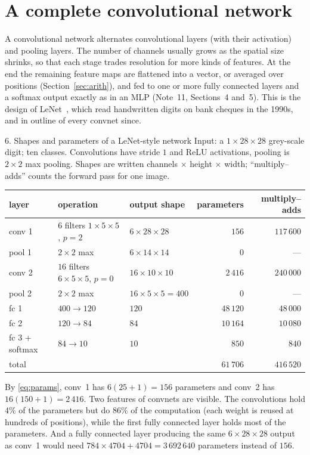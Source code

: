 \documentclass[11pt]{article}
\begin{document}
\section{A complete convolutional network}\label{sec:convnet}

A convolutional network alternates convolutional layers (with their activation) and pooling layers. The number of
channels usually grows as the spatial size shrinks, so that each stage trades resolution for more kinds of features. At
the end the remaining feature maps are flattened into a vector, or averaged over positions (Section~\ref{sec:arith}),
and fed to one or more fully connected layers and a softmax output exactly as in an MLP (Note~11, Sections~4 and~5). This is the design of
LeNet~\cite{lecun1998}, which read handwritten digits on bank cheques in the 1990s, and in outline of every convnet since.

\begin{worked}{6. Shapes and parameters of a LeNet-style network}
Input: a $1 \times 28 \times 28$ grey-scale digit; ten classes. Convolutions have stride $1$ and ReLU activations,
pooling is $2 \times 2$ max pooling. Shapes are written channels $\times$ height $\times$ width; ``multiply--adds'' counts
the forward pass for one image.
\begin{center}\small
\begin{tabular}{@{}lllrr@{}}
\toprule
layer & operation & output shape & parameters & multiply--adds \\
\midrule
conv 1 & $6$ filters $1 \times 5 \times 5$, $p = 2$ & $6 \times 28 \times 28$ & $156$ & $117\,600$ \\
pool 1 & $2 \times 2$ max & $6 \times 14 \times 14$ & $0$ & --- \\
conv 2 & $16$ filters $6 \times 5 \times 5$, $p = 0$ & $16 \times 10 \times 10$ & $2\,416$ & $240\,000$ \\
pool 2 & $2 \times 2$ max & $16 \times 5 \times 5 = 400$ & $0$ & --- \\
fc 1 & $400 \to 120$ & $120$ & $48\,120$ & $48\,000$ \\
fc 2 & $120 \to 84$ & $84$ & $10\,164$ & $10\,080$ \\
fc 3 + softmax & $84 \to 10$ & $10$ & $850$ & $840$ \\
\midrule
total & & & $61\,706$ & $416\,520$ \\
\bottomrule
\end{tabular}
\end{center}
By \eqref{eq:params}, conv~1 has $6(25 + 1) = 156$ parameters and conv~2 has $16(150 + 1) = 2\,416$. Two features of convnets are visible. The convolutions hold $4\%$ of the parameters but do $86\%$ of the computation
(each weight is reused at hundreds of positions), while the first fully connected layer holds most of the parameters.
And a fully connected layer producing the same $6 \times 28 \times 28$ output as conv~1 would need
$784 \times 4704 + 4704 = 3\,692\,640$ parameters instead of $156$.
\end{worked}
\end{document}
